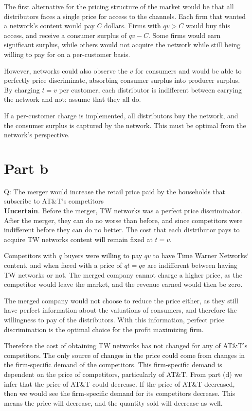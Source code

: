 \documentclass[12pt]{paper}
\begin{document}
The first alternative for the pricing structure of the market would be
that all distributors faces a single price for access to the
channels. Each firm that wanted a network's content would pay $C$
dollars. Firms with $qv > C$ would buy this access, and receive a
consumer surplus of $qv - C$. Some firms would earn significant
surplus, while others would not acquire the network while still being
willing to pay for on a per-customer basis.


However, networks could also observe the $v$ for consumers and would
be able to perfectly price discriminate, absorbing consumer surplus
into producer surplus. By charging $t=v$ per customer, each
distributor is indifferent between carrying the network and not;
assume that they all do.


If a per-customer charge is implemented, all distributors buy the
network, and the consumer surplus is captured by the network. This
must be optimal from the network's perspective.

\section*{Part b}
Q: The merger would increase the retail price paid
by the households that subscribe to AT\&T's
competitors
\\

\textbf{Uncertain}. Before the merger, TW networks was a perfect price
discriminator. After the merger, they can do no worse than before, and
since competitors were indifferent before they
can do no better. The cost that each distributor pays to acquire TW
networks content will remain fixed at $t=v$.


Competitors with $q$ buyers were willing to pay $qv$ to have Time
Warner Networks` content, and when faced with a price of $qt=qv$
are indifferent between having TW networks or not. The merged
company cannot charge a higher price, as the competitor would leave
the market, and the revenue earned would then be zero.


The merged company would not choose to reduce the price either, as
they still have perfect information about the valuations of consumers,
and therefore the willingness to pay of the distributors. With this
information, perfect price discrimination is the optimal choice for
the profit maximizing firm.


Therefore the cost of obtaining TW networks has not changed for any of
AT\&T's competitors. The only source of changes in the price could
come from changes in the firm-specific demand of the competitors. This
firm-specific demand is dependent on the price of competitors,
particularly of AT\&T. From part (d) we infer that the price of AT\&T
could decrease. If the price of AT\&T decreased, then we would see the
firm-specific demand for its competitors decrease. This means the
price will decrease, and the quantity sold will decrease as well.
\end{document}

